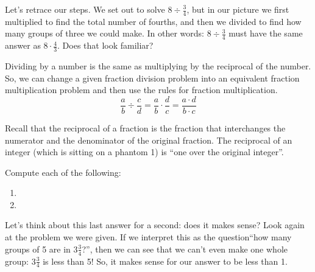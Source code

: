 Let's retrace our steps. We set out to solve $8 \div \frac{3}{4}$, but in our picture we first multiplied to find the total number of fourths, and then we divided to find how many groups of three we could make. In other words: $8 \div \frac{3}{4}$ must have the same answer as $8 \cdot \frac{4}{3}$. Does that look familiar?

\begin{boxdef}
Dividing by a number is the same as multiplying by the reciprocal of the number. So, we can change a given fraction division problem into an equivalent fraction multiplication problem and then use the rules for fraction multiplication. \[\frac{a}{b} \div \frac{c}{d} = \frac{a}{b} \cdot \frac{d}{c} = \frac{a \cdot d}{b \cdot c}\]
\end{boxdef}

Recall that the \gls{reciprocal} of a fraction is the fraction that interchanges the numerator and the denominator of the original fraction. The reciprocal of an integer (which is sitting on a phantom 1) is ``one over the original integer''.

\begin{boxex}
Compute each of the following:

\begin{enumerate}[itemsep=10pt]
\item {}

\item {}
\end{enumerate}
Let's think about this last answer for a second: does it makes sense? Look again at the problem we were given. If we interpret this as the question``how many groups of 5 are in $3\frac{3}{4}$?'', then we can see that we can't even make one whole group: $3\frac{3}{4}$ is less than 5! So, it makes sense for our answer to be less than 1.
\end{boxex}

